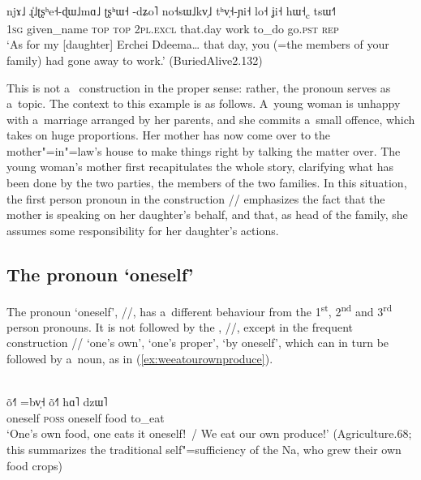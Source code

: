 \begin{exe}
  \ex
  \label{ex:goneawaytowork}
  \\
  \gll njɤ˩		ɻ̍˩ʈʂʰe˧-ɖɯ˩mɑ˩		ʈʂʰɯ˧	-dʑo˥	no˧sɯ˩kv̩˩ tʰv̩˧-ɲi˧	lo˧ 	ʝi˧	hɯ˧\textsubscript{c}	tsɯ˧˥\\
  1\textsc{sg}		given\_name	\textsc{top}	\textsc{top}	\textsc{2pl}.\textsc{excl} that.day	work	to\_do	go.\textsc{pst}	\textsc{rep}\\
  \glt ‘As for my [daughter] Erchei Ddeema{\dots} that day, you (=the members of your
  family) had gone away to work.' (BuriedAlive2.132)
\end{exe}

 \largerpage[-1]
This is not a~
construction in the proper sense: rather, the pronoun serves as a~topic. The context to this example is as follows. A~young woman is unhappy with a~marriage arranged by her parents, and she commits a~small offence, which takes on huge proportions. Her mother has now come over to the mother"=in"=law’s house to make things right by talking the matter over. The young woman’s mother first recapitulates the whole story, clarifying what has been done by the two parties, the members
of the two families. In this situation, the first person pronoun in the construction // emphasizes the fact that the mother is speaking on her daughter’s behalf, and
that, as head of the family, she assumes some responsibility for her daughter’s actions.


\subsection{The pronoun ‘oneself’}
\label{sec:thepronounoneself}
\largerpage

The pronoun ‘oneself’, //, has a~different behaviour from the 1\textsuperscript{st},
2\textsuperscript{nd} and 3\textsuperscript{rd} person pronouns. 
It is not followed by the , //, except in the frequent construction // ‘one’s own’, ‘one’s proper’, ‘by
oneself’, which can in turn be followed by a~noun, as in (\ref{ex:weeatourownproduce}).
\begin{exe}
  \ex
  \label{ex:weeatourownproduce}
  \\
  \gll õ˧˥		=bv̩˧	õ˧˥		hɑ˥		dzɯ˥\\
  oneself	\textsc{poss}	oneself		food		to\_eat\\
  \glt ‘One’s own food, one eats it oneself!~/ We eat our own produce!’ (Agriculture.68; this
  summarizes the traditional self"=sufficiency of the Na, who grew their own food crops)
\end{exe}


